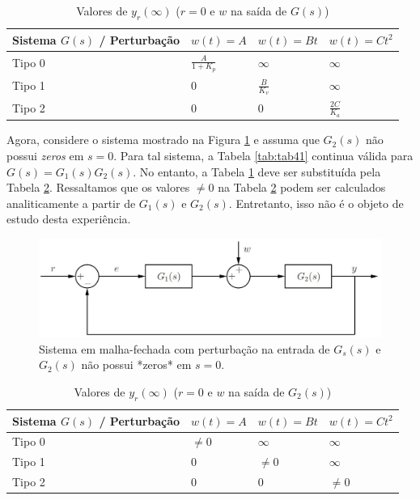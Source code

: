 \documentclass[
]{book}
\theoremstyle{definition}
\theoremstyle{definition}
\theoremstyle{definition}
\theoremstyle{remark}
\begin{document}
\begin{table}

\caption{\label{tab:tab42}Valores de $y_r(\infty)$ ($r=0$ e $w$ na saída de $G(s)$)}
\centering
\begin{tabular}[t]{llll}
\toprule
Sistema $G(s)$ / Perturbação & $w(t)=A$ & $w(t) = Bt$ & $w(t) = Ct^2$\\
\midrule
Tipo 0 & $\frac{A}{1 + K_p}$ & $\infty$ & $\infty$\\
Tipo 1 & 0 & $\frac{B}{K_v}$ & $\infty$\\
Tipo 2 & 0 & 0 & $\frac{2C}{K_a}$\\
\bottomrule
\end{tabular}
\end{table}

Agora, considere o sistema mostrado na Figura \ref{fig:fig42} e assuma que \(G_2(s)\) não possui \emph{zeros} em \(s=0\). Para tal sistema, a Tabela \ref{tab:tab41} continua válida para \(G(s) = G_1(s)G_2(s)\). No entanto, a Tabela \ref{tab:tab42} deve ser substituída pela Tabela \ref{tab:tab43}. Ressaltamos que os valores \(\neq 0\) na Tabela \ref{tab:tab43} podem ser calculados analiticamente a partir de \(G_1(s) \text{ e } G_2(s)\). Entretanto, isso não é o objeto de estudo desta experiência.

\begin{figure}
\includegraphics[width=0.8\linewidth]{Imagens/Lab4/Apresentação/fig2} \caption{Sistema em malha-fechada com perturbação na entrada de $G_s(s)$ e $G_2(s)$ não possui *zeros* em $s=0$.}\label{fig:fig42}
\end{figure}

\begin{table}

\caption{\label{tab:tab43}Valores de $y_r(\infty)$ ($r=0$ e $w$ na saída de $G_2(s)$)}
\centering
\begin{tabular}[t]{llll}
\toprule
Sistema $G(s)$ / Perturbação & $w(t)=A$ & $w(t) = Bt$ & $w(t) = Ct^2$\\
\midrule
Tipo 0 & $\neq 0$ & $\infty$ & $\infty$\\
Tipo 1 & 0 & $\neq 0$ & $\infty$\\
Tipo 2 & 0 & 0 & $\neq 0$\\
\bottomrule
\end{tabular}
\end{table}
\end{document}
